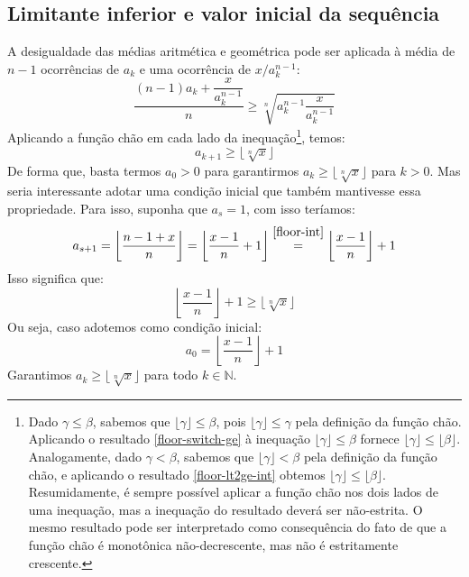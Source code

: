 \subsection*{Limitante inferior e valor inicial da sequência}

A desigualdade das médias aritmética e geométrica
pode ser aplicada à média de $n - 1$ ocorrências de $a_k$
e uma ocorrência de $x/a_k^{n-1}$:
\[
  \dfrac{(n-1) a_k + \dfrac{x}{a_k^{n-1}}}{n} \ge
  \sqrt[n]{a_k^{n-1} \dfrac{x}{a_k^{n-1}}}
\]
Aplicando a função chão em cada lado da inequação\footnote{
  Dado $\gamma \le \beta$, sabemos que
  $\lfloor \gamma \rfloor \le \beta$,
  pois $\lfloor \gamma \rfloor \le \gamma$
  pela definição da função chão.
  Aplicando o resultado \eqref{floor-switch-ge}
  à inequação $\lfloor \gamma \rfloor \le \beta$
  fornece $\lfloor \gamma \rfloor \le \lfloor \beta \rfloor$.
  Analogamente, dado $\gamma < \beta$,
  sabemos que $\lfloor \gamma \rfloor < \beta$
  pela definição da função chão,
  e aplicando o resultado \eqref{floor-lt2ge-int}
  obtemos $\lfloor \gamma \rfloor \le \lfloor \beta \rfloor$.
  Resumidamente,
  é sempre possível aplicar a função chão
  nos dois lados de uma inequação,
  mas a inequação do resultado deverá ser não-estrita.
  O mesmo resultado pode ser interpretado
  como consequência do fato
  de que a função chão é monotônica não-decrescente,
  mas não é estritamente crescente.
},
temos:
\[
  a_{k+1} \ge \lfloor \sqrt[n]{x} \rfloor
\]
De forma que, basta termos $a_0 > 0$
para garantirmos $a_k \ge \lfloor \sqrt[n]{x} \rfloor$ para $k > 0$.
Mas seria interessante adotar uma condição inicial
que também mantivesse essa propriedade.
Para isso, suponha que $a_s = 1$, com isso teríamos:
\[
  a_{s+1}
  = \left\lfloor \dfrac{n - 1 + x}{n} \right\rfloor
  = \left\lfloor \dfrac{x - 1}{n} + 1 \right\rfloor
  \stackfirst{\eqref{floor-int}}{=}
    \left\lfloor \dfrac{x - 1}{n} \right\rfloor + 1
\]
Isso significa que:
\[
  \left\lfloor \dfrac{x - 1}{n} \right\rfloor + 1
  \ge \lfloor \sqrt[n]{x} \rfloor
\]
Ou seja, caso adotemos como condição inicial:
\[
  a_0 = \left\lfloor \dfrac{x - 1}{n} \right\rfloor + 1
\]
Garantimos $a_k \ge \lfloor \sqrt[n]{x} \rfloor$
para todo $k \in \mathds{N}$.
